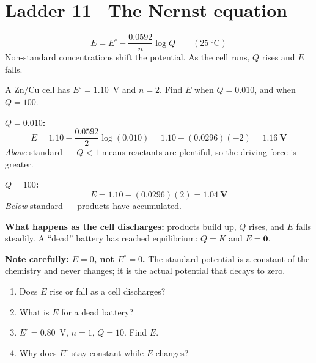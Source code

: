 \documentclass{apchem-worksheet}
\begin{document}
\section*{\sffamily Ladder 11 \textbullet\ The Nernst equation}

\[ E = E^\circ - \frac{0.0592}{n}\log Q \qquad
   (\SI{25}{\celsius}) \]
Non-standard concentrations shift the potential. As the cell runs, $Q$
rises and $E$ falls.

\begin{workedexample}
A Zn/Cu cell has $E^\circ = 1.10$~V and $n = 2$. Find $E$ when
$Q = 0.010$, and when $Q = 100$.

\textbf{$Q = 0.010$:}
\[ E = 1.10 - \frac{0.0592}{2}\log(0.010) = 1.10 - (0.0296)(-2)
   = \mathbf{1.16~V} \]
\emph{Above} standard --- $Q < 1$ means reactants are plentiful, so the
driving force is greater.

\textbf{$Q = 100$:}
\[ E = 1.10 - (0.0296)(2) = \mathbf{1.04~V} \]
\emph{Below} standard --- products have accumulated.

\textbf{What happens as the cell discharges:} products build up, $Q$ rises,
and $E$ falls steadily. A ``dead'' battery has reached equilibrium:
$Q = K$ and $E = \mathbf{0}$.

\textbf{Note carefully: $E = 0$, not $E^\circ = 0$.} The standard
potential is a constant of the chemistry and never changes; it is the
actual potential that decays to zero.
\end{workedexample}

\begin{yourturn}
\begin{enumerate}[leftmargin=*,itemsep=0.5em]
  \item Does $E$ rise or fall as a cell discharges?
        \workspace[1.4cm]
  \item What is $E$ for a dead battery? \workspace[1.4cm]
  \item $E^\circ = 0.80$~V, $n = 1$, $Q = 10$. Find $E$.
        \workspace[1.8cm]
  \item Why does $E^\circ$ stay constant while $E$ changes?
        \workspace[1.8cm]
\end{enumerate}
\end{yourturn}
\end{document}

